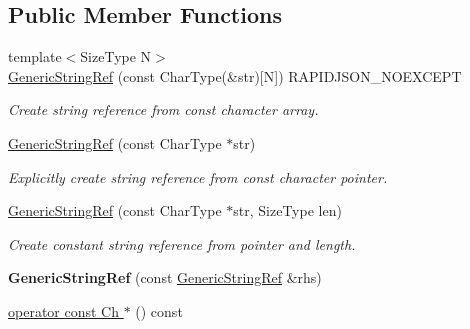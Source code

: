 \subsection*{Public Member Functions}
\begin{DoxyCompactItemize}
\item 
{\footnotesize template$<$Size\+Type N$>$ }\\\hyperlink{struct_generic_string_ref_aae0c070f914d2486a560150a927c22dc}{Generic\+String\+Ref} (const Char\+Type(\&str)\mbox{[}N\mbox{]}) R\+A\+P\+I\+D\+J\+S\+O\+N\+\_\+\+N\+O\+E\+X\+C\+E\+PT
\begin{DoxyCompactList}\small\item\em Create string reference from {\ttfamily const} character array. \end{DoxyCompactList}\item 
\hyperlink{struct_generic_string_ref_a9e80d81d5ad49cf0fb4128ace8c548d9}{Generic\+String\+Ref} (const Char\+Type $\ast$str)
\begin{DoxyCompactList}\small\item\em Explicitly create string reference from {\ttfamily const} character pointer. \end{DoxyCompactList}\item 
\hyperlink{struct_generic_string_ref_a8b2c6a7fdc4da1e7055f7fdcf0ac517f}{Generic\+String\+Ref} (const Char\+Type $\ast$str, Size\+Type len)
\begin{DoxyCompactList}\small\item\em Create constant string reference from pointer and length. \end{DoxyCompactList}\item 
{\bfseries Generic\+String\+Ref} (const \hyperlink{struct_generic_string_ref}{Generic\+String\+Ref} \&rhs)\hypertarget{struct_generic_string_ref_ab049693082c0b8f5066c00212e780aec}{}\label{struct_generic_string_ref_ab049693082c0b8f5066c00212e780aec}

\item 
\hyperlink{struct_generic_string_ref_a61a4241c23f65626ddc1da4ae5dac1b8}{operator const Ch $\ast$} () const \hypertarget{struct_generic_string_ref_a61a4241c23f65626ddc1da4ae5dac1b8}{}\label{struct_generic_string_ref_a61a4241c23f65626ddc1da4ae5dac1b8}


\end{DoxyCompactItemize}
